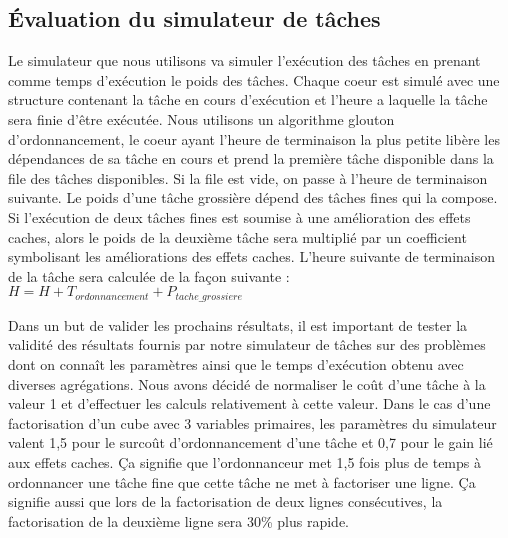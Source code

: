 \subsection{\'Evaluation du simulateur de tâches}
Le simulateur que nous utilisons va simuler l'exécution des tâches en prenant comme temps d'exécution le poids des tâches.
%
Chaque coeur est simulé avec une structure contenant la tâche en cours d'exécution et l'heure a laquelle la tâche sera finie d'être exécutée.
%
Nous utilisons un algorithme glouton d'ordonnancement, le coeur ayant l'heure de terminaison la plus petite libère les dépendances de sa tâche en cours et prend la première tâche disponible dans la file des tâches disponibles.
%
Si la file est vide, on passe à l'heure de terminaison suivante.
%
Le poids d'une tâche grossière dépend des tâches fines qui la compose.
%
Si l'exécution de deux tâches fines est soumise à une amélioration des effets caches, alors le poids de la deuxième tâche sera multiplié par un coefficient symbolisant les améliorations des effets caches.
%
L'heure suivante de terminaison de la tâche sera calculée de la façon suivante : $H = H + T_{ordonnancement} + P_{tache\_grossiere}$



Dans un but de valider les prochains résultats, il est important de tester la validité des résultats fournis par notre simulateur de tâches sur des problèmes dont on connaît les paramètres ainsi que le temps d'exécution obtenu avec diverses agrégations.
%
Nous avons décidé de normaliser le coût d'une tâche à la valeur 1 et d'effectuer les calculs relativement à cette valeur.
%
Dans le cas d'une factorisation d'un cube avec 3 variables primaires, les paramètres du simulateur valent 1,5 pour le surcoût d'ordonnancement d'une tâche et 0,7 pour le gain lié aux effets caches.
%
Ça signifie que l'ordonnanceur met 1,5 fois plus de temps à ordonnancer une tâche fine que cette tâche ne met à factoriser une ligne.
%
Ça signifie aussi que lors de la factorisation de deux lignes consécutives, la factorisation de la deuxième ligne sera 30\% plus rapide.
